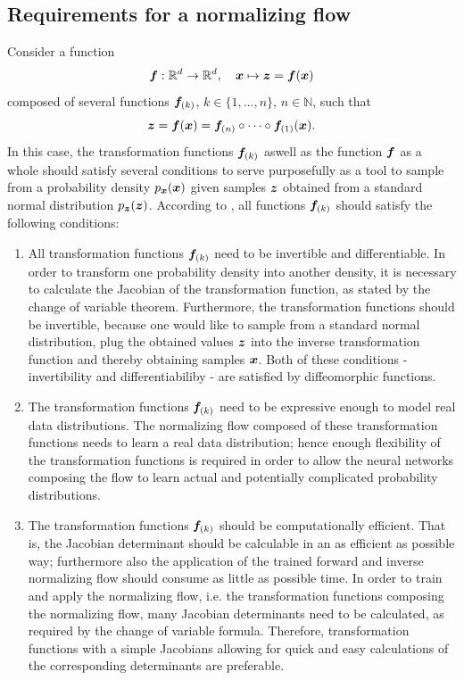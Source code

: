 \documentclass[a4paper,12pt]{report}
\begin{document}
\subsection{Requirements for a normalizing flow}
Consider a function 
\begin{equation}
\bm{f}:\mathbb{R}^d \rightarrow \mathbb{R}^d, \quad \bm{x} \mapsto \bm{z} = \bm{f}(\bm{x})
\end{equation} composed of several functions $\bm{f}_{(k)}$, $k \in \{1,\dots,n\},\,n \in \mathbb{N}$, such that \begin{equation}
\bm{z} = \bm{f}(\bm{x}) = \bm{f}_{(n)} \circ \dots \circ \bm{f}_{(1)}(\bm{x}).
\end{equation} In this case, the transformation functions $\bm{f}_{(k)}$ aswell as the function $\bm{f}$ as a whole should satisfy several conditions to serve purposefully as a tool to sample from a probability density $p_{\bm{x}}(\bm{x})$ given samples $\bm{z}$ obtained from a standard normal distribution $p_{\bm{z}}(\bm{z})$. According to \cite{Kobyzev.2021}, all functions $\bm{f}_{(k)}$ should satisfy the following conditions:
\begin{enumerate}
\item All transformation functions $\bm{f}_{(k)}$ need to be invertible and differentiable. In order to transform one probability density into another density, it is necessary to calculate the Jacobian of the transformation function, as stated by the change of variable theorem. Furthermore, the transformation functions should be invertible, because one would like to sample from a standard normal distribution, plug the obtained values $\bm{z}$ into the inverse transformation function and thereby obtaining samples $\bm{x}$. Both of these conditions - invertibility and differentiabiliby - are satisfied by diffeomorphic functions.
\item The transformation functions $\bm{f}_{(k)}$ need to be expressive enough to model real data distributions. The normalizing flow composed of these transformation functions needs to learn a real data distribution; hence enough flexibility of the transformation functions is required in order to allow the neural networks composing the flow to learn actual and potentially complicated probability distributions.
\item The transformation functions $\bm{f}_{(k)}$ should be computationally efficient. That is, the Jacobian determinant should be calculable in an as efficient as possible way; furthermore also the application of the trained forward and inverse normalizing flow should consume as little as possible time. In order to train and apply the normalizing flow, i.e. the transformation functions composing the normalizing flow, many Jacobian determinants need to be calculated, as required by the change of variable formula. Therefore, transformation functions with a simple Jacobians allowing for quick and easy calculations of the corresponding determinants are preferable.
\end{enumerate}
\end{document}
